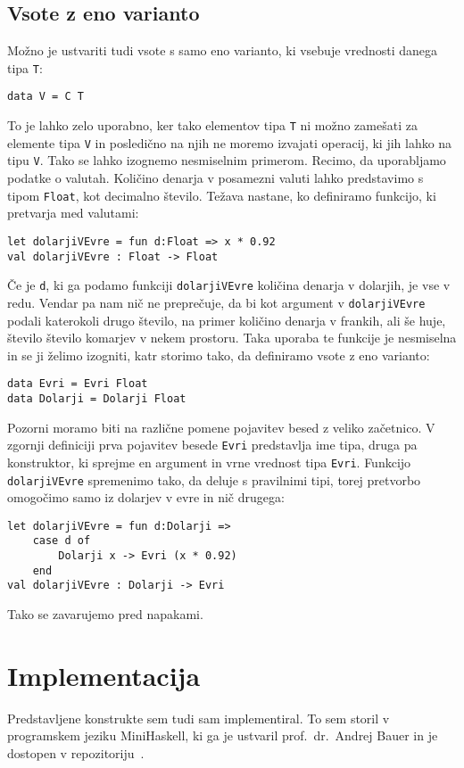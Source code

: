 \documentclass[12pt,a4paper,openany]{book}
\begin{document}
\section{Vsote z eno varianto}
Možno je ustvariti tudi vsote s samo eno varianto, ki vsebuje vrednosti danega tipa \lstinline{T}:
\begin{lstlisting}
data V = C T
\end{lstlisting}
To je lahko zelo uporabno, ker tako elementov tipa \lstinline{T} ni možno zamešati za elemente tipa \lstinline{V} in posledično na njih ne moremo izvajati operacij, ki jih lahko na tipu 
\lstinline{V}. Tako se lahko izognemo nesmiselnim primerom. Recimo, da uporabljamo podatke o valutah. Količino denarja v posamezni valuti lahko predstavimo s tipom \lstinline{Float}, kot decimalno 
število. Težava nastane, ko definiramo funkcijo, ki pretvarja med valutami:
\begin{lstlisting}
let dolarjiVEvre = fun d:Float => x * 0.92
val dolarjiVEvre : Float -> Float
\end{lstlisting}
Če je \lstinline{d}, ki ga podamo funkciji \lstinline{dolarjiVEvre} količina denarja v dolarjih, je vse v redu. Vendar pa nam nič ne 
preprečuje, da bi kot argument v \lstinline{dolarjiVEvre} podali katerokoli drugo število, na primer količino denarja v frankih, ali še huje, število število komarjev v nekem prostoru. Taka uporaba te 
funkcije je nesmiselna in se ji želimo izogniti, katr storimo tako, da definiramo vsote z eno varianto:
\begin{lstlisting}
data Evri = Evri Float
data Dolarji = Dolarji Float
\end{lstlisting}
Pozorni moramo biti na različne pomene pojavitev besed z veliko začetnico. V zgornji definiciji prva pojavitev besede \lstinline{Evri} predstavlja ime tipa, druga pa konstruktor, ki sprejme en argument in 
vrne vrednost tipa \lstinline{Evri}.
Funkcijo \lstinline{dolarjiVEvre} spremenimo tako, da deluje s pravilnimi tipi, torej pretvorbo omogočimo 
samo iz dolarjev v evre in nič drugega:
\begin{lstlisting}
let dolarjiVEvre = fun d:Dolarji =>
    case d of 
        Dolarji x -> Evri (x * 0.92)
    end
val dolarjiVEvre : Dolarji -> Evri
\end{lstlisting}
Tako se zavarujemo pred napakami.
\newpage

\chapter{Implementacija}
Predstavljene konstrukte sem tudi sam implementiral. To sem storil v programskem jeziku MiniHaskell, ki ga je ustvaril prof.\ dr.\ Andrej Bauer in 
je dostopen v repozitoriju~\cite{bauer:plzoo}.
\end{document}
